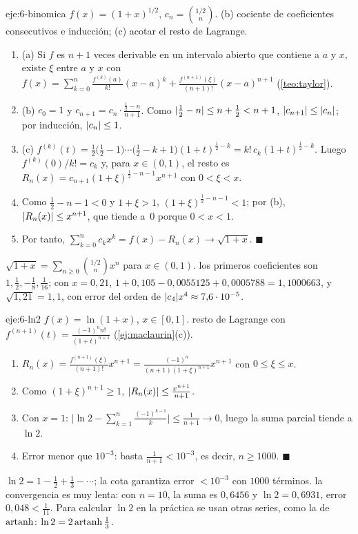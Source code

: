\begin{solucion}{eje:6-binomica}
\datos $f(x)=(1+x)^{1/2}$, $c_n=\binom{1/2}{n}$.
\planteamiento (b) cociente de coeficientes consecutivos e inducción; (c) acotar el resto de Lagrange.
\pasos
\begin{enumerate}[label=\arabic*.]
  \item (a) Si $f$ es $n+1$ veces derivable en un intervalo abierto que contiene a $a$ y $x$, existe $\xi$ entre $a$ y $x$ con $f(x)=\sum_{k=0}^{n}\frac{f^{(k)}(a)}{k!}(x-a)^{k}+\frac{f^{(n+1)}(\xi)}{(n+1)!}(x-a)^{n+1}$ (\cref{teo:taylor}).
  \item (b) $c_0=1$ y $c_{n+1}=c_n\cdot\frac{\frac12-n}{n+1}$. Como $\lvert\frac12-n\rvert\le n+\frac12<n+1$, $\lvert c_{n+1}\rvert\le\lvert c_n\rvert$; por inducción, $\lvert c_n\rvert\le1$.
  \item (c) $f^{(k)}(t)=\frac12\bigl(\frac12-1\bigr)\cdots\bigl(\frac12-k+1\bigr)(1+t)^{\frac12-k}=k!\,c_k(1+t)^{\frac12-k}$. Luego $f^{(k)}(0)/k!=c_k$ y, para $x\in(0,1)$, el resto es $R_n(x)=c_{n+1}(1+\xi)^{\frac12-n-1}x^{n+1}$ con $0<\xi<x$.
  \item Como $\frac12-n-1<0$ y $1+\xi>1$, $(1+\xi)^{\frac12-n-1}<1$; por (b), $\lvert R_n(x)\rvert\le x^{n+1}$, que tiende a~0 porque $0<x<1$.
  \item Por tanto, $\sum_{k=0}^{n}c_kx^{k}=f(x)-R_n(x)\to\sqrt{1+x}$. \hfill$\blacksquare$
\end{enumerate}
\resultado $\sqrt{1+x}=\sum_{n\ge0}\binom{1/2}{n}x^{n}$ para $x\in(0,1)$.
\comprobacion los primeros coeficientes son $1,\frac12,-\frac18,\frac1{16}$; con $x=0{,}21$, $1+0{,}105-0{,}0055125+0{,}0005788=1{,}1000663$, y $\sqrt{1{,}21}=1{,}1$, con error del orden de $\lvert c_4\rvert x^{4}\approx7{,}6\cdot10^{-5}$.
\end{solucion}

\begin{solucion}{eje:6-ln2}
\datos $f(x)=\ln(1+x)$, $x\in[0,1]$.
\planteamiento resto de Lagrange con $f^{(n+1)}(t)=\frac{(-1)^{n}n!}{(1+t)^{n+1}}$ (\cref{ej:maclaurin}(c)).
\pasos
\begin{enumerate}[label=\arabic*.]
  \item $R_n(x)=\frac{f^{(n+1)}(\xi)}{(n+1)!}x^{n+1}=\frac{(-1)^{n}}{(n+1)(1+\xi)^{n+1}}x^{n+1}$ con $0\le\xi\le x$.
  \item Como $(1+\xi)^{n+1}\ge1$, $\lvert R_n(x)\rvert\le\frac{x^{n+1}}{n+1}$.
  \item Con $x=1$: $\bigl|\ln2-\sum_{k=1}^{n}\frac{(-1)^{k-1}}{k}\bigr|\le\frac{1}{n+1}\to0$, luego la suma parcial tiende a $\ln2$.
  \item Error menor que $10^{-3}$: basta $\frac{1}{n+1}<10^{-3}$, es decir, $n\ge1000$. \hfill$\blacksquare$
\end{enumerate}
\resultado $\ln2=1-\frac12+\frac13-\cdots$; la cota garantiza error $<10^{-3}$ con $1000$ términos.
\comprobacion la convergencia es muy lenta: con $n=10$, la suma es $0{,}6456$ y $\ln2=0{,}6931$, error $0{,}048<\frac1{11}$. Para calcular $\ln2$ en la práctica se usan otras series, como la de $\operatorname{artanh}$: $\ln2=2\operatorname{artanh}\frac13$.
\end{solucion}


